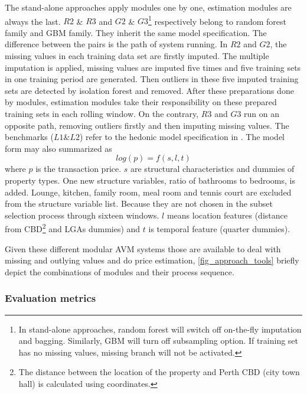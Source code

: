 The stand-alone approaches apply modules one by one, estimation modules are always the last. $R2$ \& $R3$ and $G2$ \& $G3$\footnote{In stand-alone approaches, random forest will switch off on-the-fly imputation and bagging. Similarly, GBM will turn off subsampling option. If training set has no missing values, missing branch will not be activated.} respectively belong to random forest family and GBM family. They inherit the same model specification. The difference between the pairs is the path of system running. In   $R2$ and $G2$, the missing values in each training data set are firstly imputed. The multiple imputation is applied, missing values are imputed five times and five training sets in one training period are generated. Then outliers in these five imputed training sets are detected by isolation forest and removed. After these preparations done by modules, estimation modules take their responsibility on these prepared training sets in each rolling window. On the contrary, $R3$ and $G3$ run on an opposite path, removing outliers firstly and then imputing missing values. The benchmarks ($L1 \& L2$) refer to the hedonic model specification in \citet{Leishman2013}. The model form may also summarized as
\begin{equation}
log(p) = f(s, l, t)
\end{equation}
where $p$ is the transaction price. $s$ are structural characteristics and dummies of property types. One new structure variables, ratio of bathrooms to bedrooms, is added. Lounge, kitchen, family room, meal room and tennis court are excluded from the structure variable list. Because they are not chosen in the subset selection process through sixteen windows. $l$ means location features (distance from CBD\footnote{The distance between the location of the property and Perth CBD (city town hall) is calculated using coordinates.} and LGAs dummies) and $t$ is temporal feature (quarter dummies).

\noindent Given these different modular AVM systems those are available to deal with missing and outlying values and do price estimation, \autoref{fig_approach_tools} briefly depict the combinations of modules and their process sequence.

%
\begin{quote}
\end{quote}
%

\subsubsection{Evaluation metrics}

